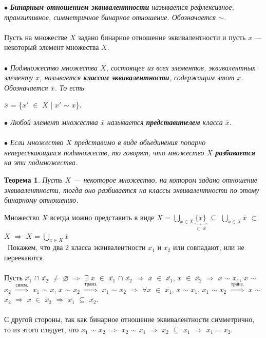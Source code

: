 $\bullet$ \textit{\textbf{Бинарным отношением эквивалентности} называется рефлексивное, транзитивное, симметричное бинарное отношение. Обозначается $\sim$.}\\\\
Пусть на множестве $X$ задано бинарное отношение эквивалентности и пусть $x$ --- некоторый элемент множества $X$.\\\\
$\bullet$ \textit{Подмножество множества $X$, состоящее из всех элементов, эквивалентных элементу $x$, называется \textbf{классом эквивалентности}, содержащим этот $x$. Обозначается $\overline{x}$. То есть}
\begin{center}
	$\overline{x}$ = \{$x'$ $\in$ $X$ | $x'$ $\sim$ $x$\}.
\end{center}
$\bullet$ \textit{Любой элемент множества $\overline{x}$ называется \textbf{представителем} класса $\overline{x}$}. \\\\
$\bullet$ \textit{Если множество $X$ представимо в виде объединения попарно непересекающихся подмножеств, то говорят, что множество $X$ \textbf{разбивается} на эти подмножества.}
\newtheorem*{t6_1}{Теорема}\begin{t6_1} Пусть $X$ --- некоторое множество, на котором задано отношение эквивалентности, тогда оно разбивается на классы эквивалентности по этому бинарному отношению. \end{t6_1} \begin{Proof} 
	Множество $X$ всегда можно представить в виде $X$ = $\underset{x \in X}{\bigcup}\underbrace{\{x\}}_{\subset \
		\overline{x}}$ $\subseteq$ $\underset{x \in X}{\bigcup}\overline{x}$ $\subset$ $X$ $\Rightarrow$ $X$ = $\underset{x \in X}{\bigcup}\overline{x}$ \\\
	Покажем, что два 2 класса эквивалентности $\overline{x_1}$ и $\overline{x_2}$ или совпадают, или не переекаются.\\\\
	Пусть $\overline{x_1}$ $\cap$ $\overline{x_2}$ $\not=$ $\varnothing$ $\Rightarrow$ $\exists$ $x$ $\in$ $\overline{x_1}$ $\cap$ $\overline{x_2}$ $\Rightarrow$ $x$ $\in$ $\overline{x_1}$, $x$ $\in$ $\overline{x_2}$ $\Rightarrow$ $x$ $\sim$ $x_1$, $x$ $\sim$ $x_2$ $\overset{\textit{симм.}}{\Rightarrow}$ $x_1$ $\sim$ $x$, $x$ $\sim$ $x_2$ $\overset{\textit{транз.}}{\Rightarrow}$ $x_1$ $\sim$ $x_2$ $\Rightarrow$ $\forall x$ $\in$ $\overline{x_1}$, $x$ $\sim$ $x_1$, $x_1$ $\sim$ $x_2$ $\overset{\textit{транз.}}{\Rightarrow}$  $x$ $\sim$ $x_2$ $\Rightarrow$ $x$ $\in$ $\overline{x_2}$ $\Rightarrow$ $\overline{x_1}$ $\subseteq$ $\overline{x_2}$.\\\\
	С другой стороны, так как бинарное отношение эквивалентности симметрично, то из этого следует, что $x_1$ $\sim$ $x_2$ $\Rightarrow$ $x_2$ $\sim$ $x_1$ $\Rightarrow$ $\overline{x_2}$ $\subseteq$ $\overline{x_1}$ $\Rightarrow$ $\overline{x_1}$ = $\overline{x_2}$.
\end{Proof}\\\\
